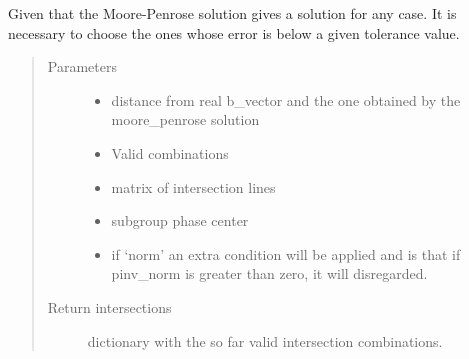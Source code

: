 \documentclass[letterpaper,12pt,english]{sphinxmanual}
\begin{document}
\begin{fulllineitems}
\label{\detokenize{functions:functions.intersections_cal}}
Given that the Moore-Penrose solution gives a solution for any case. It is necessary to choose the ones whose     error is below a given tolerance value.
\begin{quote}\begin{description}
\item[{Parameters}] \leavevmode\begin{itemize}
\item {} 
 \textendash{} distance from real b\_vector and the one obtained by the moore\_penrose solution

\item {} 
 \textendash{} Valid combinations

\item {} 
 \textendash{} matrix of intersection lines

\item {} 
 \textendash{} subgroup phase center

\item {} 
 \textendash{} if ‘norm’ an extra condition will be applied and is that if pinv\_norm is greater than zero, it     will disregarded.

\end{itemize}

\item[{Return intersections}] \leavevmode
dictionary with the so far valid intersection combinations.

\end{description}\end{quote}

\end{fulllineitems}

\end{document}
